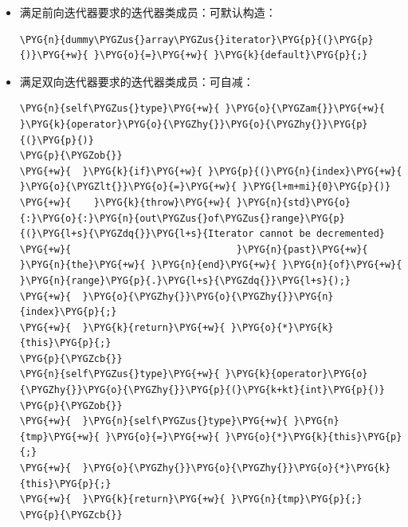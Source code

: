 \begin{itemize}

\item 满足前向迭代器要求的迭代器类成员：可默认构造：



\begin{codeblockbg}
\begin{Verbatim}[commandchars=\\\{\},breaklines=true,breakanywhere=true,fontsize=\codefont,xleftmargin=17bp]
\PYG{n}{dummy\PYGZus{}array\PYGZus{}iterator}\PYG{p}{(}\PYG{p}{)}\PYG{+w}{ }\PYG{o}{=}\PYG{+w}{ }\PYG{k}{default}\PYG{p}{;}
\end{Verbatim}
\end{codeblockbg}



\item 满足双向迭代器要求的迭代器类成员：可自减：



\begin{codeblockbg}
\begin{Verbatim}[commandchars=\\\{\},breaklines=true,breakanywhere=true,fontsize=\codefont,xleftmargin=17bp]
\PYG{n}{self\PYGZus{}type}\PYG{+w}{ }\PYG{o}{\PYGZam{}}\PYG{+w}{ }\PYG{k}{operator}\PYG{o}{\PYGZhy{}}\PYG{o}{\PYGZhy{}}\PYG{p}{(}\PYG{p}{)}
\PYG{p}{\PYGZob{}}
\PYG{+w}{  }\PYG{k}{if}\PYG{+w}{ }\PYG{p}{(}\PYG{n}{index}\PYG{+w}{ }\PYG{o}{\PYGZlt{}}\PYG{o}{=}\PYG{+w}{ }\PYG{l+m+mi}{0}\PYG{p}{)}
\PYG{+w}{    }\PYG{k}{throw}\PYG{+w}{ }\PYG{n}{std}\PYG{o}{:}\PYG{o}{:}\PYG{n}{out\PYGZus{}of\PYGZus{}range}\PYG{p}{(}\PYG{l+s}{\PYGZdq{}}\PYG{l+s}{Iterator cannot be decremented}
\PYG{+w}{                             }\PYG{n}{past}\PYG{+w}{ }\PYG{n}{the}\PYG{+w}{ }\PYG{n}{end}\PYG{+w}{ }\PYG{n}{of}\PYG{+w}{ }\PYG{n}{range}\PYG{p}{.}\PYG{l+s}{\PYGZdq{}}\PYG{l+s}{);}
\PYG{+w}{  }\PYG{o}{\PYGZhy{}}\PYG{o}{\PYGZhy{}}\PYG{n}{index}\PYG{p}{;}
\PYG{+w}{  }\PYG{k}{return}\PYG{+w}{ }\PYG{o}{*}\PYG{k}{this}\PYG{p}{;}
\PYG{p}{\PYGZcb{}}
\PYG{n}{self\PYGZus{}type}\PYG{+w}{ }\PYG{k}{operator}\PYG{o}{\PYGZhy{}}\PYG{o}{\PYGZhy{}}\PYG{p}{(}\PYG{k+kt}{int}\PYG{p}{)}
\PYG{p}{\PYGZob{}}
\PYG{+w}{  }\PYG{n}{self\PYGZus{}type}\PYG{+w}{ }\PYG{n}{tmp}\PYG{+w}{ }\PYG{o}{=}\PYG{+w}{ }\PYG{o}{*}\PYG{k}{this}\PYG{p}{;}
\PYG{+w}{  }\PYG{o}{\PYGZhy{}}\PYG{o}{\PYGZhy{}}\PYG{o}{*}\PYG{k}{this}\PYG{p}{;}
\PYG{+w}{  }\PYG{k}{return}\PYG{+w}{ }\PYG{n}{tmp}\PYG{p}{;}
\PYG{p}{\PYGZcb{}}
\end{Verbatim}
\end{codeblockbg}



\end{itemize}
